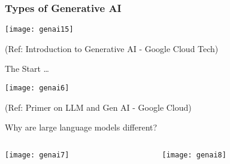 \begin{frame}[fragile]\frametitle{Types of  Generative AI}

\begin{center}
\texttt{[image: genai15]}
\end{center}


{\tiny (Ref: Introduction to Generative AI - Google Cloud Tech)}

\end{frame}

\begin{frame}[fragile]{The Start \ldots}

\begin{center}
\texttt{[image: genai6]}
\end{center}

{\tiny (Ref: Primer on LLM and Gen AI - Google Cloud)}
  
\end{frame}

\begin{frame}[fragile]{Why are large language models different? }
\begin{columns}
    \begin{column}[T]{0.5\linewidth}
\begin{center}
\texttt{[image: genai7]}
\end{center}
    \end{column}
    \begin{column}[T]{0.5\linewidth}  
	
\begin{center}
\texttt{[image: genai8]}
\end{center}

    \end{column}
  \end{columns}
  
  
\end{frame}


